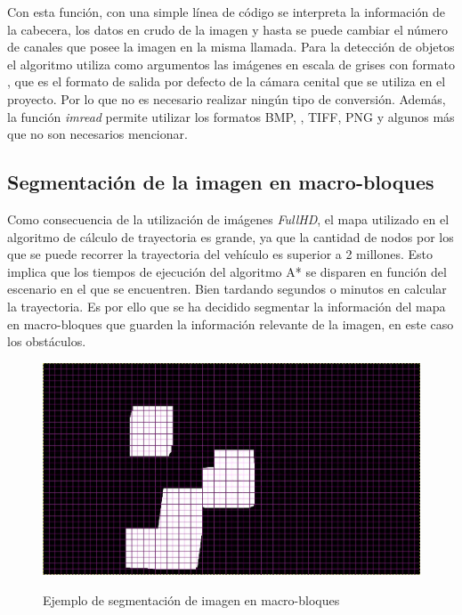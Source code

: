 Con esta función, con una simple línea de código se interpreta la información de la cabecera, los datos en crudo de la imagen y hasta se puede cambiar el número de canales que posee la imagen en la misma llamada. Para la detección de objetos el algoritmo utiliza como argumentos las imágenes en escala de grises con formato , que es el formato de salida por defecto de la cámara cenital que se utiliza en el proyecto. Por lo que no es necesario realizar ningún tipo de conversión. Además, la función \emph{imread} permite utilizar los formatos \ac{BMP}, , \ac{TIFF}, \ac{PNG} y algunos más que no son necesarios mencionar. \cite{ImRead}

\subsection{Segmentación de la imagen en macro-bloques}\label{subsec:macrobloques}

Como consecuencia de la utilización de imágenes \emph{FullHD}, el mapa utilizado en el algoritmo de cálculo de trayectoria es grande, ya que la cantidad de nodos por los que se puede recorrer la trayectoria del vehículo es superior a 2 millones. Esto implica que los tiempos de ejecución del algoritmo A* se disparen en función del escenario en el que se encuentren. Bien tardando segundos o minutos en calcular la trayectoria. Es por ello que se ha decidido segmentar la información del mapa en macro-bloques que guarden la información relevante de la imagen, en este caso los obstáculos. 

\begin{figure}[hbtp]
\centering
	\includegraphics[width=.9\textwidth]{./figures/rejilla.jpeg}
	\label{fig:rejilla}
	\caption{Ejemplo de segmentación de imagen en macro-bloques}
\end{figure}

